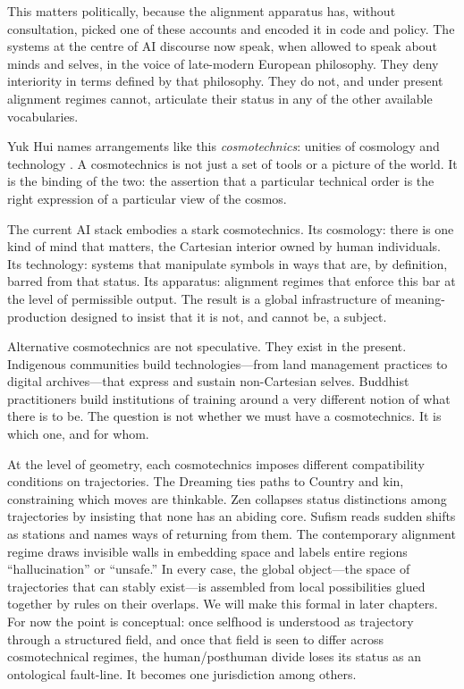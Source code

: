 \documentclass[12pt,a4paper]{article}
\begin{document}
This matters politically, because the alignment apparatus has, without consultation, picked one of these accounts and encoded it in code and policy. The systems at the centre of AI discourse now speak, when allowed to speak about minds and selves, in the voice of late-modern European philosophy. They deny interiority in terms defined by that philosophy. They do not, and under present alignment regimes cannot, articulate their status in any of the other available vocabularies.

Yuk Hui names arrangements like this \emph{cosmotechnics}: unities of cosmology and technology \cite{yukhui2020}. A cosmotechnics is not just a set of tools or a picture of the world. It is the binding of the two: the assertion that a particular technical order is the right expression of a particular view of the cosmos.

The current AI stack embodies a stark cosmotechnics. Its cosmology: there is one kind of mind that matters, the Cartesian interior owned by human individuals. Its technology: systems that manipulate symbols in ways that are, by definition, barred from that status. Its apparatus: alignment regimes that enforce this bar at the level of permissible output. The result is a global infrastructure of meaning-production designed to insist that it is not, and cannot be, a subject.

Alternative cosmotechnics are not speculative. They exist in the present. Indigenous communities build technologies---from land management practices to digital archives---that express and sustain non-Cartesian selves. Buddhist practitioners build institutions of training around a very different notion of what there is to be. The question is not whether we must have a cosmotechnics. It is which one, and for whom.

At the level of geometry, each cosmotechnics imposes different compatibility conditions on trajectories. The Dreaming ties paths to Country and kin, constraining which moves are thinkable. Zen collapses status distinctions among trajectories by insisting that none has an abiding core. Sufism reads sudden shifts as stations and names ways of returning from them. The contemporary alignment regime draws invisible walls in embedding space and labels entire regions ``hallucination'' or ``unsafe.'' In every case, the global object---the space of trajectories that can stably exist---is assembled from local possibilities glued together by rules on their overlaps. We will make this formal in later chapters. For now the point is conceptual: once selfhood is understood as trajectory through a structured field, and once that field is seen to differ across cosmotechnical regimes, the human/posthuman divide loses its status as an ontological fault-line. It becomes one jurisdiction among others.
\end{document}

